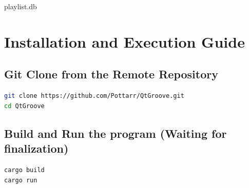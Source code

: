 \documentclass[12pt]{report} %
\begin{document}
\hspace{1cm}playlist.db








\chapter{Installation and Execution Guide}
\section{Git Clone from the Remote Repository}
\begin{lstlisting}[language=Bash ,basicstyle=\footnotesize\ttfamily]
git clone https://github.com/Pottarr/QtGroove.git
cd QtGroove
\end{lstlisting}


\section{Build and Run the program (Waiting for finalization)}
\begin{lstlisting}[language=Bash ,basicstyle=\footnotesize\ttfamily]
cargo build
cargo run
\end{lstlisting}
\end{document}
